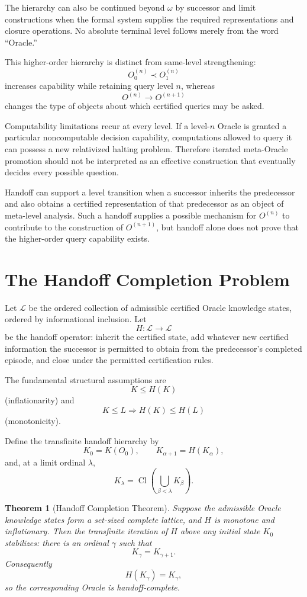 \documentclass[11pt]{article}
\newtheorem{theorem}{Theorem}[section]
\newcommand{\Cl}{\operatorname{Cl}}
\begin{document}
The hierarchy can also be continued beyond $\omega$ by successor and limit constructions when the formal system supplies the required representations and closure operations. No absolute terminal level follows merely from the word ``Oracle.''

This higher-order hierarchy is distinct from same-level strengthening:
\[
O^{(n)}_0\prec O^{(n)}_1
\]
increases capability while retaining query level $n$, whereas
\[
O^{(n)}\longrightarrow O^{(n+1)}
\]
changes the type of objects about which certified queries may be asked.

Computability limitations recur at every level. If a level-$n$ Oracle is granted a particular noncomputable decision capability, computations allowed to query it can possess a new relativized halting problem. Therefore iterated meta-Oracle promotion should not be interpreted as an effective construction that eventually decides every possible question.

Handoff can support a level transition when a successor inherits the predecessor and also obtains a certified representation of that predecessor as an object of meta-level analysis. Such a handoff supplies a possible mechanism for $O^{(n)}$ to contribute to the construction of $O^{(n+1)}$, but handoff alone does not prove that the higher-order query capability exists.

\section{The Handoff Completion Problem}
Let $\mathcal L$ be the ordered collection of admissible certified Oracle knowledge states, ordered by informational inclusion. Let
\[
H:\mathcal L\to\mathcal L
\]
be the handoff operator: inherit the certified state, add whatever new certified information the successor is permitted to obtain from the predecessor's completed episode, and close under the permitted certification rules.

The fundamental structural assumptions are
\[
K\le H(K)
\]
(inflationarity) and
\[
K\le L\Longrightarrow H(K)\le H(L)
\]
(monotonicity).

Define the transfinite handoff hierarchy by
\[
K_0=K(O_0),\qquad K_{\alpha+1}=H(K_\alpha),
\]
and, at a limit ordinal $\lambda$,
\[
K_\lambda=\Cl\left(\bigcup_{\beta<\lambda}K_\beta\right).
\]

\begin{theorem}[Handoff Completion Theorem]
Suppose the admissible Oracle knowledge states form a set-sized complete lattice, and $H$ is monotone and inflationary. Then the transfinite iteration of $H$ above any initial state $K_0$ stabilizes: there is an ordinal $\gamma$ such that
\[
K_\gamma=K_{\gamma+1}.
\]
Consequently
\[
H(K_\gamma)=K_\gamma,
\]
so the corresponding Oracle is handoff-complete.
\end{theorem}
\end{document}
